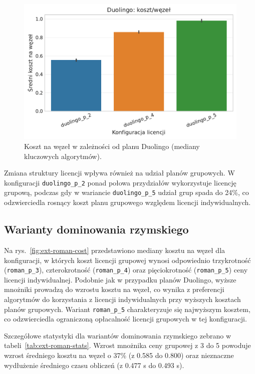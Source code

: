 \begin{figure}[H]
    \centering
    \includegraphics[width=0.6\linewidth]{assets/figures/extensions/static/duolingo_cost_per_node_comparison.pdf}
    \caption{Koszt na węzeł w zależności od planu Duolingo (mediany kluczowych algorytmów).}
    \label{fig:ext-duolingo-cost}
\end{figure}

Zmiana struktury licencji wpływa również na udział planów grupowych. W konfiguracji \texttt{duolingo\_p\_2} ponad połowa przydziałów wykorzystuje licencję grupową, podczas gdy w wariancie \texttt{duolingo\_p\_5} udział grup spada do 24\%, co odzwierciedla rosnący koszt planu grupowego względem licencji indywidualnych.

\subsection{Warianty dominowania rzymskiego}
Na rys.~\ref{fig:ext-roman-cost} przedstawiono mediany kosztu na węzeł dla konfiguracji, w których koszt licencji grupowej wynosi odpowiednio trzykrotność (\texttt{roman\_p\_3}), czterokrotność (\texttt{roman\_p\_4}) oraz pięciokrotność (\texttt{roman\_p\_5}) ceny licencji indywidualnej. Podobnie jak w przypadku planów Duolingo, wyższe mnożniki prowadzą do wzrostu kosztu na węzeł, co wynika z preferencji algorytmów do korzystania z licencji indywidualnych przy wyższych kosztach planów grupowych. Wariant \texttt{roman\_p\_5} charakteryzuje się najwyższym kosztem, co odzwierciedla ograniczoną opłacalność licencji grupowych w tej konfiguracji.

Szczegółowe statystyki dla wariantów dominowania rzymskiego zebrano w tabeli~\ref{tab:ext-roman-stats}. Wzrost mnożnika ceny grupowej z 3 do 5 powoduje wzrost średniego kosztu na węzeł o 37\% (z 0.585 do 0.800) oraz nieznaczne wydłużenie średniego czasu obliczeń (z 0.477 s do 0.493 s).

